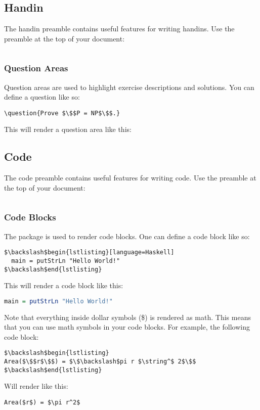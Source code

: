 \subsection{Handin}
The handin preamble contains useful features for writing handins. Use the  preamble at the top of your document:
\begin{lstlisting}[language=MyTex]
 \end{lstlisting}

\subsubsection{Question Areas}
Question areas are used to highlight exercise descriptions and solutions. You can define a question like so:
\begin{lstlisting}[language=MyTex]
\question{Prove $\$$P = NP$\$$.}\end{lstlisting}
This will render a question area like this:

\subsection{Code}
The code preamble contains useful features for writing code. Use the  preamble at the top of your document:
\begin{lstlisting}[language=MyTex]
 \end{lstlisting}

\subsubsection{Code Blocks}
The  package is used to render code blocks. One can define a code block like so:
\begin{lstlisting}[language=MyTex]
$\backslash$begin{lstlisting}[language=Haskell]
  main = putStrLn "Hello World!"
$\backslash$end{lstlisting}
\end{lstlisting}
This will render a code block like this:
\begin{lstlisting}[language=Haskell]
main = putStrLn "Hello World!"
\end{lstlisting}
Note that everything inside dollar symbols (\$) is rendered as math. This means that you can use math symbols in your code blocks. For example, the following code block:
\begin{lstlisting}[language=MyTex]
$\backslash$begin{lstlisting}
Area($\$$r$\$$) = $\$\backslash$pi r $\string^$ 2$\$$
$\backslash$end{lstlisting}
\end{lstlisting}
Will render like this:
\begin{lstlisting}
Area($r$) = $\pi r^2$
\end{lstlisting}

